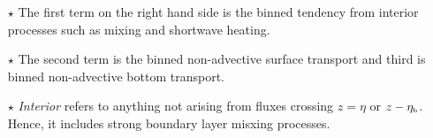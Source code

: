 \documentclass[10pt]{beamer}
\begin{document}
\begin{frame}
\begin{itemize}
\item[$\star$] The first term on the right hand side is the binned tendency from
interior processes such as mixing and shortwave heating.  

\item[$\star$] The second term is the binned non-advective surface
transport and third is binned non-advective bottom transport.  

\item[$\star$] {\it Interior} refers to anything not arising from
  fluxes crossing $z=\eta$ or $z-\eta_{\mbox{\tiny b}}$.  Hence, it
  includes strong boundary layer misxing processes.

\end{itemize}


\end{frame}
\end{document}

